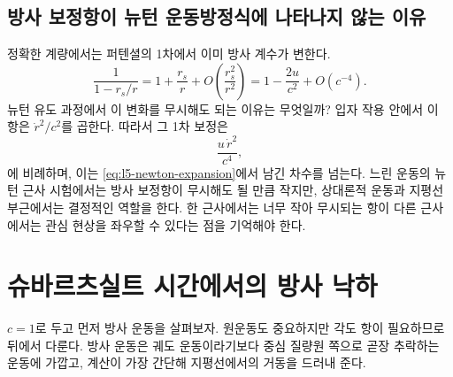 \begin{classroomqa}
\end{classroomqa}

\subsection{방사 보정항이 뉴턴 운동방정식에 나타나지 않는 이유}

정확한 계량에서는 퍼텐셜의 1차에서 이미 방사 계수가 변한다.
\begin{equation}
\frac{1}{1-r_s/r}
=1+\frac{r_s}{r}
+O\!\left(\frac{r_s^2}{r^2}\right)
=1-\frac{2u}{c^2}+O(c^{-4}).
\label{eq:l5-radial-expansion}
\end{equation}
뉴턴 유도 과정에서 이 변화를 무시해도 되는 이유는 무엇일까? 입자 작용 안에서 이 항은 \(\dot r^2/c^2\)를 곱한다. 따라서 그 1차 보정은
\begin{equation}
\frac{u\,\dot r^2}{c^4},
\end{equation}
에 비례하며, 이는 \eqref{eq:l5-newton-expansion}에서 남긴 차수를 넘는다. 느린 운동의 뉴턴 근사 시험에서는 방사 보정항이 무시해도 될 만큼 작지만, 상대론적 운동과 지평선 부근에서는 결정적인 역할을 한다. 한 근사에서는 너무 작아 무시되는 항이 다른 근사에서는 관심 현상을 좌우할 수 있다는 점을 기억해야 한다.

\section{슈바르츠실트 시간에서의 방사 낙하}

\(c=1\)로 두고 먼저 방사 운동을 살펴보자. 원운동도 중요하지만 각도 항이 필요하므로 뒤에서 다룬다. 방사 운동은 궤도 운동이라기보다 중심 질량원 쪽으로 곧장 추락하는 운동에 가깝고, 계산이 가장 간단해 지평선에서의 거동을 드러내 준다.

\begin{classroomqa}
\end{classroomqa}

